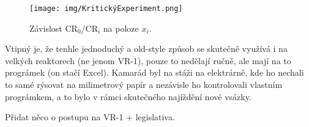 \begin{figure}[H] 
    \centering
    \texttt{[image: img/KritickýExperiment.png]}
    \caption{Závislost CR$_0$/CR$_i$ na poloze $x_i$.}
    \label{SNM}
\end{figure}

Vtipný je, že tenhle jednoduchý a old-style způsob se skutečně využívá i na velkých reaktorech (ne jenom VR-1), pouze to nedělají ručně, ale mají na to prográmek (on stačí Excel). Kamarád byl na stáži na elektrárně, kde ho nechali to samé rýsovat na milimetrový papír a nezávisle ho kontrolovali vlastním prográmkem, a to bylo v rámci skutečného najíždění nové vsázky.

Přidat něco o postupu na VR-1 + legislativa.